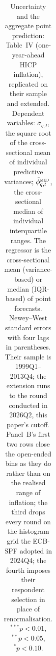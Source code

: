 \begin{table}[tbp]
\begin{tabular}{lccccc}
\bottomrule
\end{tabular}
\caption{Uncertainty and the aggregate point prediction: \citet{abel2016measurement} Table~IV
(one-year-ahead HICP inflation), replicated on their sample and extended. Dependent variables:
$\bar\sigma_{q,t}$, the square root of the cross-sectional mean of individual predictive
variances; $\tilde\phi^{\textsc{med}}_{q,t}$, the cross-sectional median of individual
interquartile ranges. The regressor is the cross-sectional mean (variance-based) or median
(IQR-based) of point forecasts. Newey--West standard errors with four lags in parentheses.
Their sample is 1999Q1--2013Q4; the extension runs to the round conducted in 2026Q2, this
paper's cutoff. Panel~B's first two rows close the open-ended bins as they do rather than on the
realised range of inflation; the third drops every round on the histogram grid the ECB-SPF
adopted in 2024Q4; the fourth imposes their respondent selection in place of renormalisation.
$^{***}p<0.01$, $^{**}p<0.05$, $^{*}p<0.10$.}
\label{tab:abel_replication}
\end{table}
